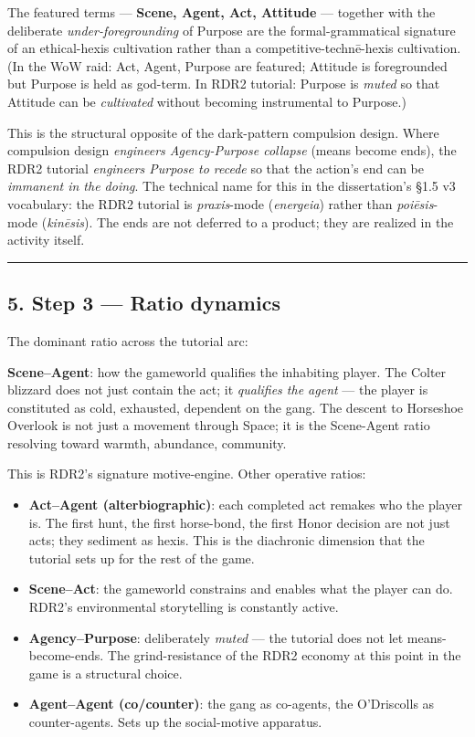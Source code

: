 \documentclass[11pt]{report}
\begin{document}
The featured terms — \textbf{Scene, Agent, Act, Attitude} — together with the deliberate \textit{under-foregrounding} of Purpose are the formal-grammatical signature of an ethical-hexis cultivation rather than a competitive-technē-hexis cultivation. (In the WoW raid: Act, Agent, Purpose are featured; Attitude is foregrounded but Purpose is held as god-term. In RDR2 tutorial: Purpose is \textit{muted} so that Attitude can be \textit{cultivated} without becoming instrumental to Purpose.)


This is the structural opposite of the dark-pattern compulsion design. Where compulsion design \textit{engineers Agency-Purpose collapse} (means become ends), the RDR2 tutorial \textit{engineers Purpose to recede} so that the action's end can be \textit{immanent in the doing}. The technical name for this in the dissertation's §1.5 v3 vocabulary: the RDR2 tutorial is \textit{praxis}-mode (\textit{energeia}) rather than \textit{poiēsis}-mode (\textit{kinēsis}). The ends are not deferred to a product; they are realized in the activity itself.


\vspace{0.4em}\hrule\vspace{0.8em}


\subsection{5. Step 3 — Ratio dynamics}


The dominant ratio across the tutorial arc:


\begin{diabox}
\textbf{Scene–Agent}: how the gameworld qualifies the inhabiting player. The Colter blizzard does not just contain the act; it \textit{qualifies the agent} — the player is constituted as cold, exhausted, dependent on the gang. The descent to Horseshoe Overlook is not just a movement through Space; it is the Scene-Agent ratio resolving toward warmth, abundance, community.

\end{diabox}


This is RDR2's signature motive-engine. Other operative ratios:


\begin{itemize}
\item \textbf{Act–Agent (alterbiographic)}: each completed act remakes who the player is. The first hunt, the first horse-bond, the first Honor decision are not just acts; they sediment as hexis. This is the diachronic dimension that the tutorial sets up for the rest of the game.
\item \textbf{Scene–Act}: the gameworld constrains and enables what the player can do. RDR2's environmental storytelling is constantly active.
\item \textbf{Agency–Purpose}: deliberately \textit{muted} — the tutorial does not let means-become-ends. The grind-resistance of the RDR2 economy at this point in the game is a structural choice.
\item \textbf{Agent–Agent (co/counter)}: the gang as co-agents, the O'Driscolls as counter-agents. Sets up the social-motive apparatus.
\end{itemize}
\end{document}
